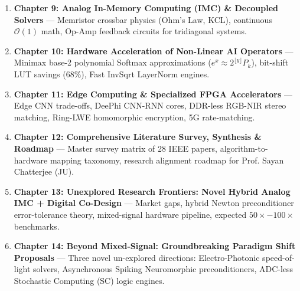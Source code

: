 \documentclass[11pt,a4paper,oneside]{book}
\begin{document}
\begin{conceptbox}
\begin{enumerate}[leftmargin=*, start=9]
    \item \textbf{Chapter 9: Analog In-Memory Computing (IMC) \& Decoupled Solvers} --- Memristor crossbar physics (Ohm's Law, KCL), continuous $\mathcal{O}(1)$ math, Op-Amp feedback circuits for tridiagonal systems.
    \item \textbf{Chapter 10: Hardware Acceleration of Non-Linear AI Operators} --- Minimax base-2 polynomial Softmax approximations ($e^x \approx 2^{\lfloor y \rfloor} P_k$), bit-shift LUT savings ($68\%$), Fast InvSqrt LayerNorm engines.
    \item \textbf{Chapter 11: Edge Computing \& Specialized FPGA Accelerators} --- Edge CNN trade-offs, DeePhi CNN-RNN cores, DDR-less RGB-NIR stereo matching, Ring-LWE homomorphic encryption, 5G rate-matching.
    \item \textbf{Chapter 12: Comprehensive Literature Survey, Synthesis \& Roadmap} --- Master survey matrix of 28 IEEE papers, algorithm-to-hardware mapping taxonomy, research alignment roadmap for Prof. Sayan Chatterjee (JU).
    \item \textbf{Chapter 13: Unexplored Research Frontiers: Novel Hybrid Analog IMC + Digital Co-Design} --- Market gaps, hybrid Newton preconditioner error-tolerance theory, mixed-signal hardware pipeline, expected $50\times-100\times$ benchmarks.
    \item \textbf{Chapter 14: Beyond Mixed-Signal: Groundbreaking Paradigm Shift Proposals} --- Three novel un-explored directions: Electro-Photonic speed-of-light solvers, Asynchronous Spiking Neuromorphic preconditioners, ADC-less Stochastic Computing (SC) logic engines.
\end{enumerate}
\end{conceptbox}

\tableofcontents
\listoffigures
\listoftables

\mainmatter
















\backmatter



\end{document}
